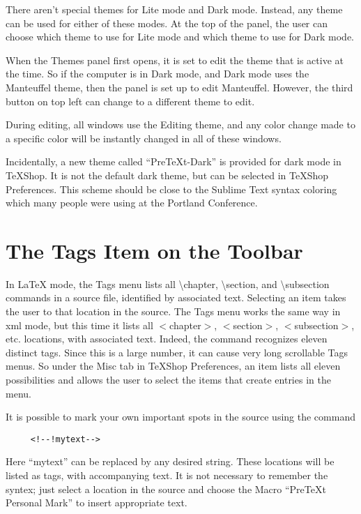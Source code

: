 \documentclass[11pt, oneside]{article}   	%
\begin{document}
There aren't special themes  for Lite mode and Dark mode. Instead, any theme can be used for either of these modes. At the top of the panel, the user can choose which theme to use for Lite mode and which theme to use for Dark mode. 

When the Themes panel first opens, it is set to edit the theme that is active at the time. So if the computer is in Dark mode, and Dark mode uses the Manteuffel theme, then the panel is set up to edit Manteuffel. However, the third button on top left can change to a different theme to edit.

During editing, all windows use the Editing theme, and any color change made to a specific color will be instantly changed in all of these windows.

Incidentally, a new theme called ``PreTeXt-Dark'' is provided for dark mode in TeXShop. It is not the default dark theme, but can be selected in TeXShop Preferences. This scheme should be close to the Sublime Text syntax coloring which many people were using at the Portland Conference.

\section{The Tags Item on the Toolbar}

In LaTeX mode, the Tags menu lists all \textbackslash chapter, \textbackslash section, and \textbackslash subsection commands in a  source file, identified by associated text. Selecting an item takes the user to that location in the source. The Tags menu works the same way in xml mode, but this time it lists all
$<$chapter$>$,  $<$section$>$, $<$subsection$>$, etc. locations, with associated text. Indeed, the command recognizes eleven distinct tags. Since this is a large number, it can cause very long scrollable Tags menus. So under the Misc tab in TeXShop Preferences, an item lists all eleven possibilities and allows the user to select the items that create entries in the menu.

It is possible to mark your own important spots in the source using the command
\begin{verbatim}
     <!--!mytext-->
\end{verbatim}

Here ``mytext'' can be replaced by any desired string. These locations will be listed as tags, with accompanying text. It is not necessary to remember the syntex; just select a location in the source and choose the Macro
``PreTeXt Personal Mark'' to insert appropriate text.
\end{document}
